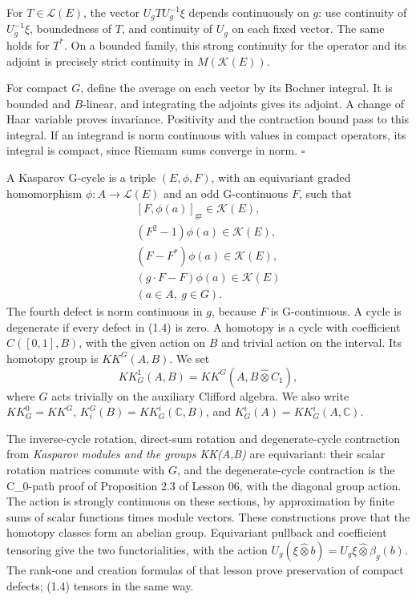 \documentclass[
  11pt,
]{article}
\begin{document}
For \(T\in\mathcal L(E)\), the vector \(U_gT U_g^{-1}\xi\) depends
continuously on \(g\): use continuity of \(U_g^{-1}\xi\), boundedness of
\(T\), and continuity of \(U_g\) on each fixed vector. The same holds
for \(T^*\). On a bounded family, this strong continuity for the
operator and its adjoint is precisely strict continuity in
\(M(\mathcal K(E))\).

For compact \(G\), define the average on each vector by its Bochner
integral. It is bounded and \(B\)-linear, and integrating the adjoints
gives its adjoint. A change of Haar variable proves invariance.
Positivity and the contraction bound pass to this integral. If an
integrand is norm continuous with values in compact operators, its
integral is compact, since Riemann sums converge in norm. \(\square\)

A Kasparov G-cycle is a triple \((E,\phi,F)\), with an equivariant
graded homomorphism \(\phi:A\to\mathcal L(E)\) and an odd G-continuous
\(F\), such that \[
\begin{gathered}
{}[F,\phi(a)]_{\mathrm{gr}}\in\mathcal K(E),\\
(F^2-1)\phi(a)\in\mathcal K(E),\\
(F-F^*)\phi(a)\in\mathcal K(E),\\
(g\cdot F-F)\phi(a)\in\mathcal K(E)\\
(a\in A,\ g\in G).
\end{gathered}
\tag{1.4}
\] The fourth defect is norm continuous in \(g\), because \(F\) is
G-continuous. A cycle is degenerate if every defect in (1.4) is zero. A
homotopy is a cycle with coefficient \(C([0,1],B)\), with the given
action on \(B\) and trivial action on the interval. Its homotopy group
is \(KK^G(A,B)\). We set \[
KK_G^1(A,B)=KK^G(A,B\widehat\otimes C_1),
\tag{1.5}
\] where \(G\) acts trivially on the auxiliary Clifford algebra. We also
write \(KK_G^0=KK^G\), \(K_i^G(B)=KK_G^i(\mathbb C,B)\), and
\(K_G^i(A)=KK_G^i(A,\mathbb C)\).

The inverse-cycle rotation, direct-sum rotation and degenerate-cycle
contraction from \emph{Kasparov modules and the groups KK(A,B)} are
equivariant: their scalar rotation matrices commute with \(G\), and the
degenerate-cycle contraction is the C\_0-path proof of Proposition 2.3
of Lesson 06, with the diagonal group action. The action is strongly
continuous on these sections, by approximation by finite sums of scalar
functions times module vectors. These constructions prove that the
homotopy classes form an abelian group. Equivariant pullback and
coefficient tensoring give the two functorialities, with the action
\(U_g(\xi\widehat\otimes b)=U_g\xi\widehat\otimes\beta_g(b)\). The
rank-one and creation formulas of that lesson prove preservation of
compact defects; (1.4) tensors in the same way.
\end{document}
